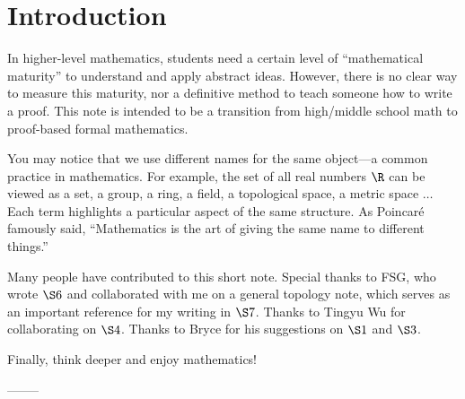 \documentclass[10pt]{article}
\begin{document}
\hsetup
\htoc
\hmain
\section*{Introduction}
In higher-level mathematics, students need a certain level of ``mathematical maturity'' to understand and apply abstract ideas. However, there is no clear way to measure this maturity, nor a definitive method to teach someone how to write a proof. This note is intended to be a transition from high/middle school math to proof-based formal mathematics.
\par
You may notice that we use different names for the same object—a common practice in mathematics. For example, the set of all real numbers $\R$ can be viewed as a set, a group, a ring, a field, a topological space, a metric space $\dots$ Each term highlights a particular aspect of the same structure. As Poincaré famously said, ``Mathematics is the art of giving the same name to different things.''
\par
Many people have contributed to this short note. Special thanks to FSG, who wrote $\S 6$ and collaborated with me on a general topology note, which serves as an important reference for my writing in $\S 7$. Thanks to Tingyu Wu for collaborating on $\S 4$. Thanks to Bryce for his suggestions on $\S 1$ and $\S 3$.
\par
Finally, think deeper and enjoy mathematics!
\begin{flushright}
    -------- 
\end{flushright}
\end{document}
